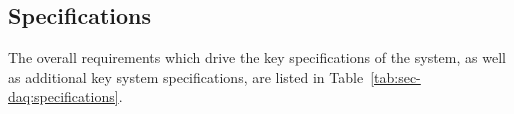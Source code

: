  
\subsection{Specifications}
\label{sec:sd-daq:specifications}


The overall   requirements which drive the key specifications of the
 system, as well as additional key  system specifications, are
listed in Table~\ref{tab:sec-daq:specifications}.

%

